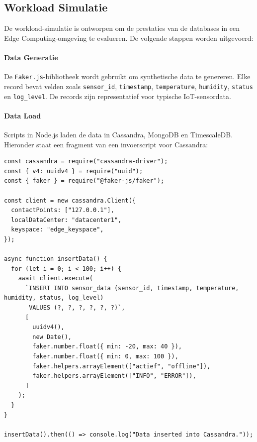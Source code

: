 \subsection{Workload Simulatie}
De workload-simulatie is ontworpen om de prestaties van de databases in een Edge Computing-omgeving te evalueren. De volgende stappen worden uitgevoerd:

\paragraph{Data Generatie}
De \texttt{Faker.js}-bibliotheek wordt gebruikt om synthetische data te genereren. Elke record bevat velden zoals \texttt{sensor\_id}, \texttt{timestamp}, \texttt{temperature}, \texttt{humidity}, \texttt{status} en \texttt{log\_level}. De records zijn representatief voor typische IoT-sensordata.

\paragraph{Data Load}
Scripts in Node.js laden de data in Cassandra, MongoDB en TimescaleDB. Hieronder staat een fragment van een invoerscript voor Cassandra:

\begin{verbatim}
const cassandra = require("cassandra-driver");
const { v4: uuidv4 } = require("uuid");
const { faker } = require("@faker-js/faker");

const client = new cassandra.Client({
  contactPoints: ["127.0.0.1"],
  localDataCenter: "datacenter1",
  keyspace: "edge_keyspace",
});

async function insertData() {
  for (let i = 0; i < 100; i++) {
    await client.execute(
      `INSERT INTO sensor_data (sensor_id, timestamp, temperature, humidity, status, log_level)
       VALUES (?, ?, ?, ?, ?, ?)`,
      [
        uuidv4(),
        new Date(),
        faker.number.float({ min: -20, max: 40 }),
        faker.number.float({ min: 0, max: 100 }),
        faker.helpers.arrayElement(["actief", "offline"]),
        faker.helpers.arrayElement(["INFO", "ERROR"]),
      ]
    );
  }
}

insertData().then(() => console.log("Data inserted into Cassandra."));
\end{verbatim}

